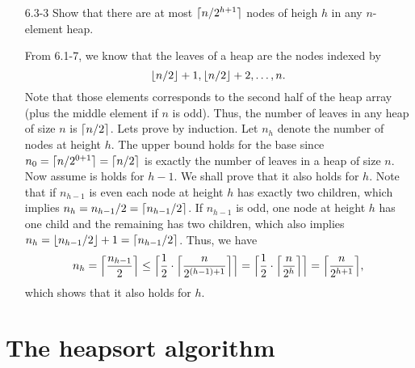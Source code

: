\begin{enumerate}
\item[6.3-3]{Show that there are at most $\lceil n/2^{h + 1}\rceil$ nodes of heigh $h$
in any $n$-element heap.}

\begin{framed}
From 6.1-7, we know that the leaves of a heap are the nodes indexed by
\[
\lfloor n/2\rfloor + 1, \lfloor n/2\rfloor + 2, \dots, n.
\]
Note that those elements corresponds to the second half of the heap array (plus
the middle element if $n$ is odd). Thus, the number of leaves in any heap of
size $n$ is $\lceil n/2\rceil$. Lets prove by induction. Let $n_h$ denote the number
of nodes at height $h$. The upper bound holds for the base since
$n_0 = \lceil n/2^{0 + 1}\rceil = \lceil n/2\rceil$ is exactly the number of leaves in
a heap of size $n$. Now assume is holds for $h - 1$. We shall prove that it
also holds for $h$.  Note that if $n_{h - 1}$ is even each node at height $h$
has exactly two children, which implies
$n_h = n_{h - 1}/2 = \lceil n_{h - 1}/2\rceil$. If $n_{h - 1}$ is odd, one node at
height $h$ has one child and the remaining has two children, which also implies
$n_h = \lfloor n_{h - 1}/2\rfloor + 1 = \lceil n_{h - 1}/2\rceil$. Thus, we have
\[
  n_h =   \Bigl\lceil \frac{n_{h - 1}}{2} \Bigr\rceil
      \le \Bigl\lceil\frac{1}{2} \cdot \Bigl\lceil\frac{n}{2^{(h - 1) + 1}}\Bigr\rceil\Bigr\rceil
      =   \Bigl\lceil\frac{1}{2} \cdot \Bigl\lceil\frac{n}{2^h}\Bigr\rceil\Bigr\rceil
      =   \Bigl\lceil \frac{n}{2^{h + 1}} \Bigr\rceil,
\]
which shows that it also holds for $h$.
\end{framed}

\end{enumerate}

\newpage

\section{The heapsort algorithm}

